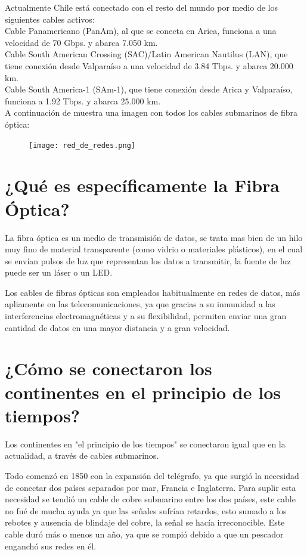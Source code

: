 \documentclass{article}
\begin{document}
Actualmente Chile está conectado con el resto del mundo por medio de los siguientes cables activos: \\

Cable Panamericano (PanAm), al que se conecta en Arica, funciona a una velocidad de 70 Gbps. y abarca 7.050 km.\\

Cable South American Crossing (SAC)/Latin American Nautilus (LAN), que tiene conexión desde Valparaíso a una velocidad de 3.84 Tbps. y abarca 20.000 km. \\

Cable South America-1 (SAm-1), que tiene conexión desde Arica y Valparaíso, funciona a 1.92 Tbps. y abarca 25.000 km.\\

A continuación de muestra una imagen con todos los cables submarinos de fibra óptica:

\begin{figure}[H]
\centering
\texttt{[image: red\_de\_redes.png]}
\end{figure}

\section{¿Qué es específicamente la Fibra Óptica?}

La fibra óptica es un medio de transmisión de datos, se trata mas bien de un hilo muy fino de material transparente (como vidrio o materiales plásticos), en el cual se envían pulsos de luz que representan los datos a transmitir, la fuente de luz puede ser un láser o un LED.

Los cables de fibras ópticas son empleados habitualmente en redes de datos, más apliamente en las telecomunicaciones, ya que gracias a su inmunidad a las interferencias electromagnéticas y a su flexibilidad, permiten enviar una gran cantidad de datos en una mayor distancia y a gran velocidad.\\


\section{¿Cómo se conectaron los continentes en el principio de los tiempos?}

Los continentes en "el principio de los tiempos" se conectaron igual que en la actualidad, a través de cables submarinos.

Todo comenzó en 1850 con la expansión del telégrafo, ya que surgió la necesidad de conectar dos países separados por mar, Francia e Inglaterra. Para suplir esta necesidad se tendió un cable de cobre submarino entre los dos países, este cable no fué de mucha ayuda ya que las señales sufrían retardos, esto sumado a los rebotes y ausencia de blindaje del cobre, la señal se hacía irreconocible. Este cable duró más o menos un año, ya que se rompió debido a que un pescador enganchó sus redes en él.
\end{document}

